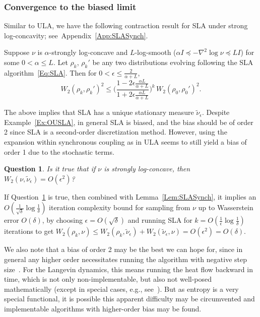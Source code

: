 \documentclass[final,12pt]{colt2018}
\newtheorem{question}{Question}
\begin{document}
\subsubsection{Convergence to the biased limit}

Similar to ULA, we have the following contraction result for SLA under strong log-concavity; see~Appendix~\ref{App:SLASynch}.

\begin{lemma}\label{Lem:SLASynch}
Suppose $\nu$ is $\alpha$-strongly log-concave and $L$-log-smooth ($\alpha I \preceq -\nabla^2 \log \nu \preceq LI$) for some $0 < \alpha \le L$.
Let $\rho_k$, $\rho_k'$ be any two distributions evolving following the SLA algorithm~\eqref{Eq:SLA}.
Then for $0 < \epsilon \le \frac{2}{\alpha+L}$,
$$W_2(\rho_k,\rho_k')^2 \le \Bigg(\frac{1-2\epsilon\frac{\alpha L}{\alpha+L}}{1+2\epsilon\frac{ \alpha L}{\alpha+L}}\Bigg)^k \, W_2(\rho_0,\rho_0')^2.$$
\end{lemma}

The above implies that SLA has a unique stationary measure $\tilde \nu_\epsilon$.
Despite Example~\ref{Ex:OUSLA}, in general SLA is biased, and the bias should be of order 2 since SLA is a second-order discretization method.
However, using the expansion within synchronous coupling as in ULA seems to still yield a bias of order 1 due to the stochastic terms. 

\begin{question}\label{Q:SLA}
Is it true that if $\nu$ is strongly log-concave, then $W_2(\nu, \tilde \nu_\epsilon) = O(\epsilon^2)$?
\end{question}

If Question~\ref{Q:SLA} is true, then combined with Lemma~\ref{Lem:SLASynch}, it implies an $O(\frac{1}{\sqrt{\delta}} \log \frac{1}{\delta})$ iteration complexity bound for sampling from $\nu$ up to Wasserstein error $O(\delta)$, by choosing $\epsilon = O(\sqrt{\delta})$ and running SLA for $k = O(\frac{1}{\epsilon} \log \frac{1}{\delta})$ iterations to get $W_2(\rho_k,\nu) \le W_2(\rho_k,\tilde\nu_\epsilon) + W_2(\tilde \nu_\epsilon,\nu) = O(\epsilon^2) = O(\delta)$.

We also note that a bias of order 2 may be the best we can hope for, since in general any higher order necessitates running the algorithm with negative step size~\cite[Theorem~3.18]{HLW06}.
For the Langevin dynamics, this means running the heat flow backward in time, which is not only non-implementable, but also not well-posed mathematically (except in special cases, e.g., see~\cite{M61}).
But as entropy is a very special functional, it is possible this apparent difficulty may be circumvented and implementable algorithms with higher-order bias may be found.
\end{document}
